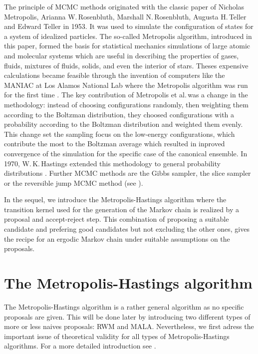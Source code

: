 The principle of MCMC methods originated with the classic paper of Nicholas Metropolis, Arianna W.\,Rosenbluth, Marshall N.\,Rosenbluth, Augusta H.\,Teller and Edward Teller \autocite{Metropolis1953} in 1953. It was used to simulate the configuration of states for a system of idealized particles. The so-called Metropolis algorithm, introduced in this paper, formed the basis for statistical mechanics simulations of large atomic and molecular systems which are useful in describing the properties of gases, fluids, mixtures of fluids, solids, and even the interior of stars. Theses expensive calculations became feasible through the invention of computers like the MANIAC at Los Alamos National Lab where the Metropolis algorithm was run for the first time \autocites{MCAtWork1987, UlamNeumannMC1987}. 
The key contribution of Metropolis et al.\,was a change in the methodology: instead of choosing configurations randomly, then weighting them according to the Boltzman distribution, they choosed configurations with a probability according to the Boltzman distribution and weighted them evenly. This change set the sampling focus on the low-energy configurations, which contribute the most to the Boltzman average which resulted in inproved convergence of the simulation for the specific case of the canonical ensemble. In 1970, W.\,K.\,Hastings extended this methodology to general probability distributions \autocite{Hastings1970}. Further MCMC methods are the Gibbs sampler, the slice sampler or the reversible jump MCMC method (see \autocite{Robert2005}).

In the sequel, we introduce the Metropolis-Hastings algorithm where the transition kernel used for the generation of the Markov chain is realized by a proposal and accept-reject step. This combination of proposing a suitable candidate and prefering good candidates but not excluding the other ones, gives the recipe for an ergodic Markov chain under suitable assumptions on the proposals.

\section{The Metropolis-Hastings algorithm}
\label{MH-TheMetropolis-HastingsAlgo}

The Metropolis-Hastings algorithm is a rather general algorithm as no specific proposals are given. This will be done later by introducing two different types of more or less naives proposals: RWM and MALA. Nevertheless, we first adress the important issue of theoretical validity for all types of Metropolis-Hastings algorithms. For a more detailed introduction see \autocite{Robert2005}.

